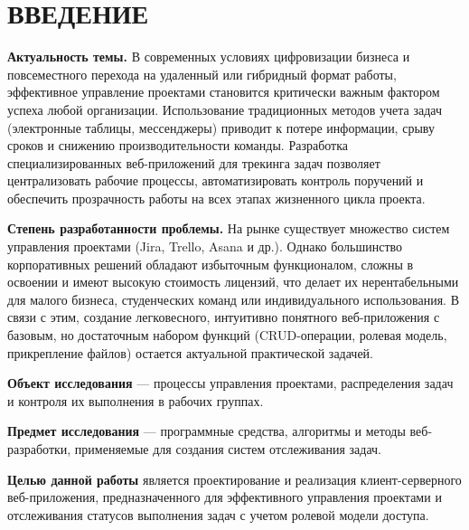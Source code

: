\section*{ВВЕДЕНИЕ}

\textbf{Актуальность темы.} В современных условиях цифровизации бизнеса и повсеместного перехода на удаленный или гибридный формат работы, эффективное управление проектами становится критически важным фактором успеха любой организации. Использование традиционных методов учета задач (электронные таблицы, мессенджеры) приводит к потере информации, срыву сроков и снижению производительности команды. Разработка специализированных веб-приложений для трекинга задач позволяет централизовать рабочие процессы, автоматизировать контроль поручений и обеспечить прозрачность работы на всех этапах жизненного цикла проекта.

\textbf{Степень разработанности проблемы.} На рынке существует множество систем управления проектами (Jira, Trello, Asana и др.). Однако большинство корпоративных решений обладают избыточным функционалом, сложны в освоении и имеют высокую стоимость лицензий, что делает их нерентабельными для малого бизнеса, студенческих команд или индивидуального использования. В связи с этим, создание легковесного, интуитивно понятного веб-приложения с базовым, но достаточным набором функций (CRUD-операции, ролевая модель, прикрепление файлов) остается актуальной практической задачей.

\textbf{Объект исследования} — процессы управления проектами, распределения задач и контроля их выполнения в рабочих группах.

\textbf{Предмет исследования} — программные средства, алгоритмы и методы веб-разработки, применяемые для создания систем отслеживания задач.

\textbf{Целью данной работы} является проектирование и реализация клиент-серверного веб-приложения, предназначенного для эффективного управления проектами и отслеживания статусов выполнения задач с учетом ролевой модели доступа.